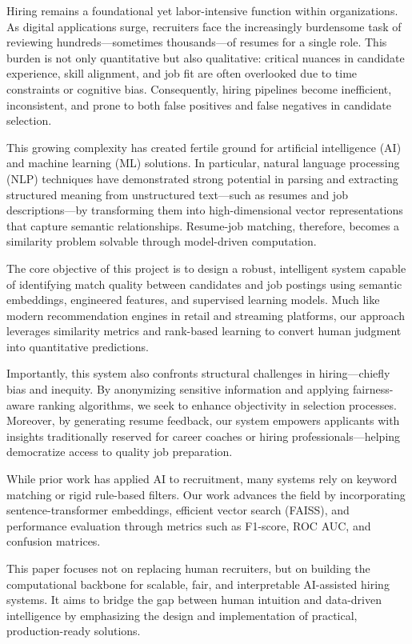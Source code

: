 \documentclass[a4paper]{article}
\begin{document}
\begin{multicols}{2}
Hiring remains a foundational yet labor-intensive function within organizations. As digital applications surge, recruiters face the increasingly burdensome task of reviewing hundreds—sometimes thousands—of resumes for a single role. This burden is not only quantitative but also qualitative: critical nuances in candidate experience, skill alignment, and job fit are often overlooked due to time constraints or cognitive bias. Consequently, hiring pipelines become inefficient, inconsistent, and prone to both false positives and false negatives in candidate selection.

This growing complexity has created fertile ground for artificial intelligence (AI) and machine learning (ML) solutions. In particular, natural language processing (NLP) techniques have demonstrated strong potential in parsing and extracting structured meaning from unstructured text—such as resumes and job descriptions—by transforming them into high-dimensional vector representations that capture semantic relationships. Resume-job matching, therefore, becomes a similarity problem solvable through model-driven computation.

The core objective of this project is to design a robust, intelligent system capable of identifying match quality between candidates and job postings using semantic embeddings, engineered features, and supervised learning models. Much like modern recommendation engines in retail and streaming platforms, our approach leverages similarity metrics and rank-based learning to convert human judgment into quantitative predictions.

Importantly, this system also confronts structural challenges in hiring—chiefly bias and inequity. By anonymizing sensitive information and applying fairness-aware ranking algorithms, we seek to enhance objectivity in selection processes. Moreover, by generating resume feedback, our system empowers applicants with insights traditionally reserved for career coaches or hiring professionals—helping democratize access to quality job preparation.

While prior work has applied AI to recruitment, many systems rely on keyword matching or rigid rule-based filters. Our work advances the field by incorporating sentence-transformer embeddings, efficient vector search (FAISS), and performance evaluation through metrics such as F1-score, ROC AUC, and confusion matrices.

This paper focuses not on replacing human recruiters, but on building the computational backbone for scalable, fair, and interpretable AI-assisted hiring systems. It aims to bridge the gap between human intuition and data-driven intelligence by emphasizing the design and implementation of practical, production-ready solutions.




\end{multicols}
\end{document}
